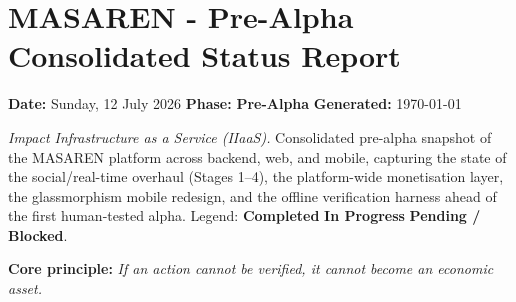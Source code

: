 \documentclass[11pt,a4paper]{article}
\newcommand{\status}[1]{\textcolor{masarengreen}{\bfseries #1}}
\newcommand{\wip}[1]{\textcolor{masarenamber}{\bfseries #1}}
\newcommand{\gap}[1]{\textcolor{masarenred}{\bfseries #1}}
\begin{document}
\section*{MASAREN - Pre-Alpha Consolidated Status Report}
\textbf{Date:} Sunday, 12 July 2026 \quad \textbf{Phase:} \textcolor{masarenblue}{\bfseries Pre-Alpha} \quad \textbf{Generated:} \today
\par\vspace{0.3em}
\textit{Impact Infrastructure as a Service (IIaaS).} Consolidated pre-alpha snapshot of the MASAREN platform across backend, web, and mobile, capturing the state of the social/real-time overhaul (Stages 1--4), the platform-wide monetisation layer, the glassmorphism mobile redesign, and the offline verification harness ahead of the first human-tested alpha. Legend: \status{Completed} \quad \wip{In Progress} \quad \gap{Pending / Blocked}.

\vspace{0.5em}
\noindent\textbf{Core principle:} \textit{If an action cannot be verified, it cannot become an economic asset.}

\vspace{0.6em}
\end{document}

